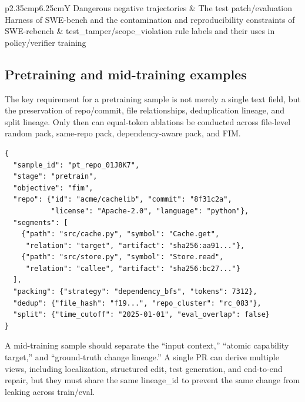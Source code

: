 \documentclass[10pt,a4paper,UTF8,fontset=none]{ctexart}
\newcommand{\ident}[1]{{\rmfamily #1}}
\begin{document}
\begin{table}[htbp]
\begin{tabularx}{\textwidth}{p{2.35cm}p{6.25cm}Y}
Dangerous negative trajectories & The test patch/evaluation Harness of SWE-bench and the contamination and reproducibility constraints of SWE-rebench\cite{en:jimenez2024swebench,en:swebenchharness2026,en:badertdinov2025swerebench} & \ident{test\_tamper}/\ident{scope\_violation} rule labels and their uses in policy/verifier training \\
\bottomrule
\end{tabularx}
\end{table}

\subsection{Pretraining and mid-training examples}

The key requirement for a pretraining sample is not merely a single \ident{text} field, but the preservation of repo/commit, file relationships, deduplication lineage, and split lineage. Only then can equal-token ablations be conducted across file-level random pack, same-repo pack, dependency-aware pack, and FIM.

\begin{lstlisting}[style=codeblock,caption={Repo-level pretraining/FIM example},label={en:lst:pretrain-sample}]
{
  "sample_id": "pt_repo_01J8K7",
  "stage": "pretrain",
  "objective": "fim",
  "repo": {"id": "acme/cachelib", "commit": "8f31c2a",
           "license": "Apache-2.0", "language": "python"},
  "segments": [
    {"path": "src/cache.py", "symbol": "Cache.get",
     "relation": "target", "artifact": "sha256:aa91..."},
    {"path": "src/store.py", "symbol": "Store.read",
     "relation": "callee", "artifact": "sha256:bc27..."}
  ],
  "packing": {"strategy": "dependency_bfs", "tokens": 7312},
  "dedup": {"file_hash": "f19...", "repo_cluster": "rc_083"},
  "split": {"time_cutoff": "2025-01-01", "eval_overlap": false}
}
\end{lstlisting}

A mid-training sample should separate the “input context,” “atomic capability target,” and “ground-truth change lineage.” A single PR can derive multiple views, including localization, structured edit, test generation, and end-to-end repair, but they must share the same \ident{lineage\_id} to prevent the same change from leaking across train/eval.
\end{document}

